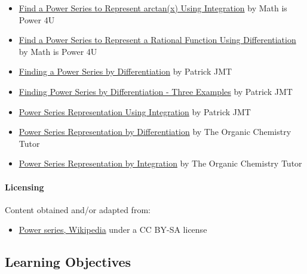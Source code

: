 \begin{itemize}
    \item \href{https://www.youtube.com/watch?v=bvNPmQRY8Ts}{Find a Power Series to Represent arctan(x) Using Integration} by Math is Power 4U
    \item \href{https://www.youtube.com/watch?v=ujB-5zQWZAY}{Find a Power Series to Represent a Rational Function Using Differentiation} by Math is Power 4U
    \item \href{https://www.youtube.com/watch?v=JCF3jgmsJuY}{Finding a Power Series by Differentiation} by Patrick JMT
    \item \href{https://www.youtube.com/watch?v=fLJsUpZnt1M}{Finding Power Series by Differentiation - Three Examples} by Patrick JMT
    \item \href{https://www.youtube.com/watch?v=L9xrmXtmMcA}{Power Series Representation Using Integration} by Patrick JMT
    \item \href{https://www.youtube.com/watch?v=PmHaNjDBh_c}{Power Series Representation by Differentiation} by The Organic Chemistry Tutor
    \item \href{https://www.youtube.com/watch?v=0HyM3nM87mk}{Power Series Representation by Integration} by The Organic Chemistry Tutor
\end{itemize}

\paragraph{Licensing}



Content obtained and/or adapted from:



\begin{itemize}
    \item \href{https://en.wikipedia.org/wiki/Power_series}{Power series, Wikipedia} under a CC BY-SA license
\end{itemize}

\subsection{Learning Objectives}

